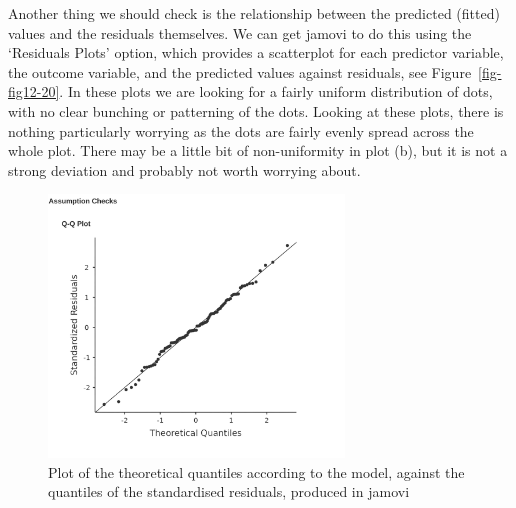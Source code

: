 \documentclass[
  a4paper,
]{book}
\begin{document}
Another thing we should check is the relationship between the predicted
(fitted) values and the residuals themselves. We can get jamovi to do
this using the `Residuals Plots' option, which provides a scatterplot
for each predictor variable, the outcome variable, and the predicted
values against residuals, see Figure~\ref{fig-fig12-20}. In these plots
we are looking for a fairly uniform distribution of dots, with no clear
bunching or patterning of the dots. Looking at these plots, there is
nothing particularly worrying as the dots are fairly evenly spread
across the whole plot. There may be a little bit of non-uniformity in
plot (b), but it is not a strong deviation and probably not worth
worrying about.

\begin{figure}[H]

\includegraphics[width=0.7\textwidth,height=\textheight]{images/fig12-19.png} \hfill{}

\caption{\label{fig-fig12-19}Plot of the theoretical quantiles according
to the model, against the quantiles of the standardised residuals,
produced in jamovi}

\end{figure}
\end{document}
